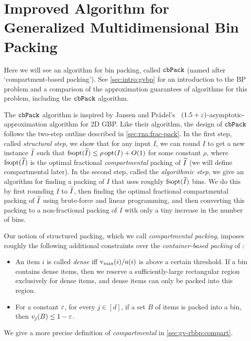 \chapter{Improved Algorithm for Generalized Multidimensional Bin Packing}
\label{chap:gv-rbbp}

Here we will see an algorithm for  bin packing,
called $\operatorname{\mathtt{cbPack}}$ (named after `compartment-based packing').
See \cref{sec:intro:gvbp} for an introduction to the  BP problem
and a comparison of the approximation guarantees of algorithms for this problem,
including the $\operatorname{\mathtt{cbPack}}$ algorithm.

The $\operatorname{\mathtt{cbPack}}$ algorithm is inspired by Jansen and Pr\"adel's~\cite{jansen2016new,pradel-thesis}
$(1.5+\varepsilon)$-asymptotic-approximation algorithm for 2D GBP. Like their algorithm,
the design of $\operatorname{\mathtt{cbPack}}$ follows the two-step outline described in \cref{sec:rna:frac-pack}.
In the first step, called \emph{structural step},
we show that for any input $I$, we can round $I$ to get a new instance $\widetilde{I}$
such that $\operatorname{fsopt}(\widetilde{I}) \le \rho\operatorname{opt}(I) + O(1)$ for some constant $\rho$,
where $\operatorname{fsopt}(\widetilde{I})$ is the optimal fractional \emph{compartmental} packing of $\widetilde{I}$
(we will define compartmental later).
In the second step, called the \emph{algorithmic step},
we give an algorithm for finding a packing of $I$ that uses roughly $\operatorname{fsopt}(\widetilde{I})$ bins.
We do this by first rounding $I$ to $\widetilde{I}$,
then finding the optimal fractional compartmental packing of $\widetilde{I}$
using brute-force and linear programming, and then converting this packing
to a non-fractional packing of $I$ with only a tiny increase in the number of bins.

Our notion of structured packing, which we call \emph{compartmental packing},
imposes roughly the following additional constraints over the
\emph{container-based packing} of \cite{pradel-thesis}:
\begin{itemize}
\item An item $i$ is called \emph{dense} iff $\operatorname{v_{\max}}(i)/a(i)$ is above a certain threshold.
If a bin contains dense items, then we reserve a sufficiently-large rectangular region
exclusively for dense items, and dense items can only be packed into this region.
\item For a constant $\varepsilon$, for every $j \in [d]$, if a set $B$ of items
is packed into a bin, then $v_j(B) \le 1-\varepsilon$.
\end{itemize}
We give a more precise definition of \emph{compartmental} in \cref{sec:gv-rbbp:compart}.

